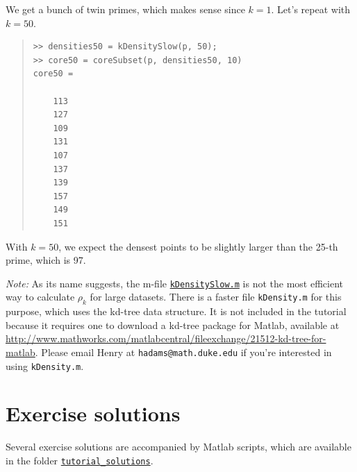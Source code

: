 \documentclass[amscd, amssymb, verbatim]{amsart}[12pt]
\theoremstyle{remark}
\theoremstyle{remark}
\theoremstyle{remark}
\begin{document}
We get a bunch of twin primes, which makes sense since $k = 1$. Let's repeat with $k = 50$.

\begin{quote} \begin{verbatim}
>> densities50 = kDensitySlow(p, 50);
>> core50 = coreSubset(p, densities50, 10)
core50 =

    113
    127
    109
    131
    107
    137
    139
    157
    149
    151
\end{verbatim} \end{quote}
 
With $k = 50$, we expect the densest points to be slightly larger than the 25-th prime, which is 97. 

{\em Note:} As its name suggests, the m-file \href{https://github.com/appliedtopology/javaplex/tree/master/src/matlab/for_distribution/tutorial_examples/kDensitySlow.m}{\texttt{kDensitySlow.m}} is not the most efficient way to calculate $\rho_k$ for large datasets. There is a faster file \texttt{kDensity.m} for this purpose, which uses the kd-tree data structure. It is not included in the tutorial because it requires one to download a kd-tree package for Matlab, available at \url{http://www.mathworks.com/matlabcentral/fileexchange/21512-kd-tree-for-matlab}. Please email Henry at \texttt{hadams@math.duke.edu} if you're interested in using \texttt{kDensity.m}. 






\section{Exercise solutions}\label{A:solutions}

Several exercise solutions are accompanied by Matlab scripts, which are available in the folder \href{https://github.com/appliedtopology/javaplex/tree/master/src/matlab/for_distribution/tutorial_solutions}{\texttt{tutorial\_solutions}}.
\end{document}
